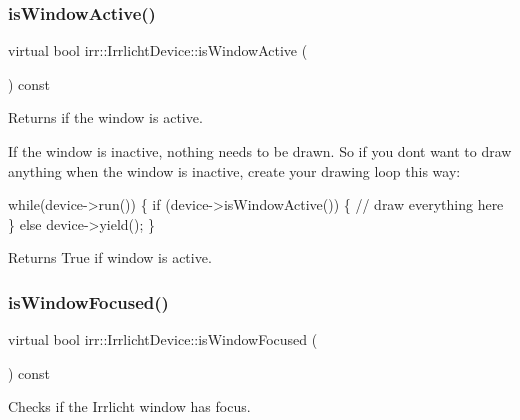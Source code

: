 \subsubsection{\texorpdfstring{is\+Window\+Active()}{isWindowActive()}\hspace{0.1cm}{\footnotesize\ttfamily [3/3]}}
{\footnotesize\ttfamily virtual bool irr\+::\+Irrlicht\+Device\+::is\+Window\+Active (\begin{DoxyParamCaption}{ }\end{DoxyParamCaption}) const\hspace{0.3cm}{\ttfamily [pure virtual]}}



Returns if the window is active. 

If the window is inactive, nothing needs to be drawn. So if you don\textquotesingle{}t want to draw anything when the window is inactive, create your drawing loop this way\+: 
\begin{DoxyCode}
\textcolor{keywordflow}{while}(device->run())
\{
    \textcolor{keywordflow}{if} (device->isWindowActive())
    \{
        \textcolor{comment}{// draw everything here}
    \}
    \textcolor{keywordflow}{else}
        device->yield();
\}
\end{DoxyCode}
 \begin{DoxyReturn}{Returns}
True if window is active. 
\end{DoxyReturn}
\mbox{\label{classirr_1_1IrrlichtDevice_a960069dc52b4f1303d18945dcbad7f3a}} 
\subsubsection{\texorpdfstring{is\+Window\+Focused()}{isWindowFocused()}\hspace{0.1cm}{\footnotesize\ttfamily [1/3]}}
{\footnotesize\ttfamily virtual bool irr\+::\+Irrlicht\+Device\+::is\+Window\+Focused (\begin{DoxyParamCaption}{ }\end{DoxyParamCaption}) const\hspace{0.3cm}{\ttfamily [pure virtual]}}



Checks if the Irrlicht window has focus. 

